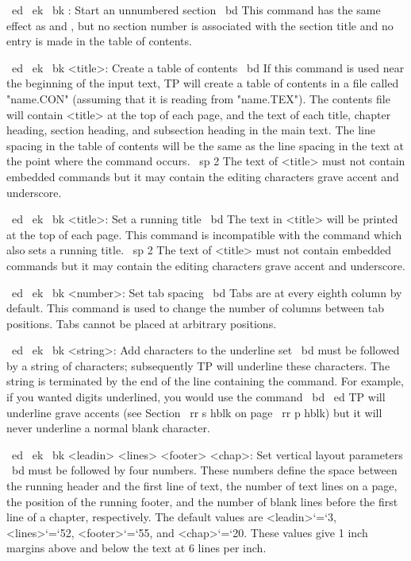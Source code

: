 ~ed ~ek ~bk \SU: Start an unnumbered section
~bd This command has the same effect as \SE and \SS, but no section
number is associated with the section title and no entry is made in the
table of contents.

~ed ~ek ~bk \TC <title>: Create a table of contents
~bd If this command is used near the beginning of the input text,
TP will create a table of contents in a file called "name.CON"
(assuming that it is reading from "name.TEX").
The contents file will contain <title> at the top of each page,
and the text of each title, chapter heading, section heading, and
subsection heading in the main text.
The line spacing in the table of contents will be the same as the line
spacing in the text at the point where the \TC command occurs.
~sp 2 The text of <title> must not contain embedded commands but it may
contain the editing characters grave accent and underscore.

~ed ~ek ~bk \TL <title>: Set a running title
~bd The text in <title> will be printed at the top of each page.
This command is incompatible with the command \CH which also sets
a running title.
~sp 2 The text of <title> must not contain embedded commands but it may
contain the editing characters grave accent and underscore.

~ed ~ek ~bk \TS <number>: Set tab spacing
~bd Tabs are at every eighth column by default.
This command is used to change the number of columns between tab positions.
Tabs cannot be placed at arbitrary positions.

~ed ~ek ~bk \UL <string>: Add characters to the underline set
~bd \UL must be followed by a string of characters; subsequently TP will
underline these characters.
The string is terminated by the end of the line containing the \UL command.
For example, if you wanted digits underlined, you would use the command
~bd  ~ed
TP will underline grave accents (see Section ~rr s hblk on page
~rr p hblk) but it will never underline a normal blank character.

~ed ~ek ~bk \VL <leadin> <lines> <footer> <chap>: 
Set vertical layout parameters
~bd \VL must be followed by four numbers.
These numbers define the space between the running header and the first
line of text, the number of text lines on a page, the position of
the running footer, and the number of blank lines before the first line of a
chapter, respectively.
The default values are <leadin>`=`3, <lines>`=`52, <footer>`=`55, and
<chap>`=`20.
These values give 1 inch margins above and below the text at 6 lines per inch.

